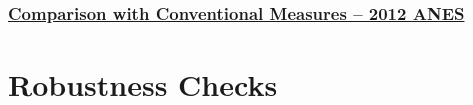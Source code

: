 \subsection{}
\begin{frame} %
\frametitle{\hyperlink{corplot_components}{Comparison with Conventional Measures -- 2012 ANES}}\label{corplot}
  \begin{figure}
  \end{figure}
\end{frame}


\section{Robustness Checks}

